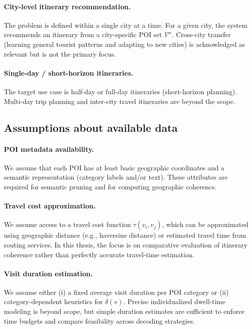 \paragraph{City-level itinerary recommendation.}
The problem is defined within a single city at a time. For a given city, the system recommends an itinerary from a city-specific POI set $\mathcal{V}^{\star}$. Cross-city transfer (learning general tourist patterns and adapting to new cities) is acknowledged as relevant but is not the primary focus.

\paragraph{Single-day / short-horizon itineraries.}
The target use case is half-day or full-day itineraries (short-horizon planning). Multi-day trip planning and inter-city travel itineraries are beyond the scope.

\subsection{Assumptions about available data}
\paragraph{POI metadata availability.}
We assume that each POI has at least basic geographic coordinates and a semantic representation (category labels and/or text). These attributes are required for semantic pruning and for computing geographic coherence.

\paragraph{Travel cost approximation.}
We assume access to a travel cost function $\tau(v_i, v_j)$, which can be approximated using geographic distance (e.g., haversine distance) or estimated travel time from routing services. In this thesis, the focus is on comparative evaluation of itinerary coherence rather than perfectly accurate travel-time estimation.

\paragraph{Visit duration estimation.}
We assume either (i) a fixed average visit duration per POI category or (ii) category-dependent heuristics for $\delta(v)$. Precise individualized dwell-time modeling is beyond scope, but simple duration estimates are sufficient to enforce time budgets and compare feasibility across decoding strategies.


